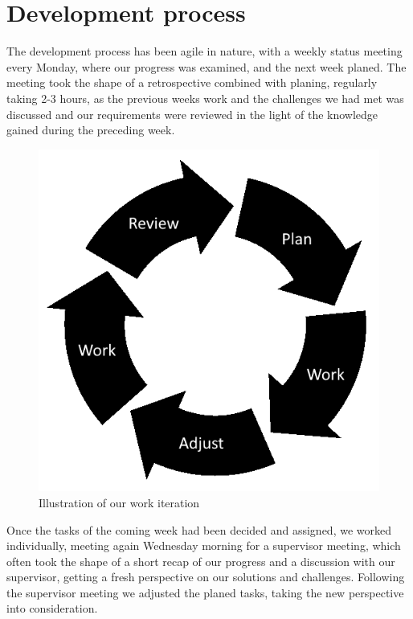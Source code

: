 \section{Development process}


The development process has been agile in nature, with a weekly status meeting every Monday, where our progress was examined, and the next week planed. The meeting took the shape of a retrospective combined with planing, regularly taking 2-3 hours, as the previous weeks work and the challenges we had met was discussed and our requirements were reviewed in the light of the knowledge gained during the preceding week.

\begin{figure}[h]
\centering
\includegraphics[scale=0.5]{02-Body/Images/WorkIterations.png}
\caption{Illustration of our work iteration}
\label{fig:iterate}
\end{figure}

Once the tasks of the coming week had been decided and assigned, we worked individually, meeting again Wednesday morning for a supervisor meeting, which often took the shape of a short recap of our progress and a discussion with our supervisor, getting a fresh perspective on our solutions and challenges. Following the supervisor meeting we adjusted the planed tasks, taking the new perspective into consideration.

